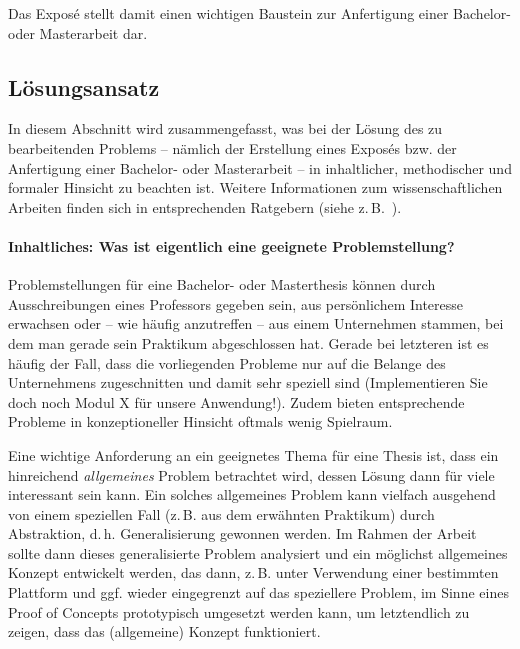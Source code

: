 \documentclass[11pt]{scrartcl}
\newcommand{\qto}[1]{\glqq #1\grqq}				%
\newcommand{\zB}{\mbox{z.\,B.}\xspace}
\newcommand{\dH}{\mbox{d.\,h.}\xspace} %
\newcommand{\ggf}{ggf.\xspace}
\newcommand{\bzw}{bzw.\xspace}
\begin{document}
\noindent
Das Exposé stellt damit einen wichtigen Baustein zur Anfertigung einer Bachelor- oder Masterarbeit dar.


\subsection{Lösungsansatz}

In diesem Abschnitt wird zusammengefasst, was bei der Lösung des zu bearbeitenden \qto{Problems} -- nämlich der Erstellung eines Exposés \bzw der Anfertigung einer Bachelor- oder Masterarbeit -- in inhaltlicher, methodischer und formaler Hinsicht zu beachten ist. Weitere Informationen zum wissenschaftlichen Arbeiten finden sich in entsprechenden Ratgebern (siehe \zB~\cite{lit:FolzEtAl:Studi-SOS}).

\paragraph{Inhaltliches: Was ist eigentlich eine geeignete Problemstellung?}

Problemstellungen für eine Bachelor- oder Masterthesis können durch Ausschreibungen eines Professors gegeben sein, aus persönlichem Interesse erwachsen oder -- wie häufig anzutreffen -- aus einem Unternehmen stammen, bei dem man gerade sein Praktikum abgeschlossen hat. Gerade bei letzteren ist es häufig der Fall, dass die vorliegenden Probleme nur auf die Belange des Unternehmens zugeschnitten und damit sehr speziell sind (\qto{Implementieren Sie doch noch Modul X für unsere Anwendung!}). Zudem bieten entsprechende Probleme in konzeptioneller Hinsicht oftmals wenig Spielraum.

Eine wichtige Anforderung an ein geeignetes Thema für eine Thesis ist, dass ein hinreichend \emph{allgemeines} Problem betrachtet wird, dessen Lösung dann für viele interessant sein kann. Ein solches allgemeines Problem kann vielfach ausgehend von einem speziellen Fall (\zB aus dem erwähnten Praktikum) durch Abstraktion, \dH Generalisierung gewonnen werden. Im Rahmen der Arbeit sollte dann dieses generalisierte Problem analysiert und ein möglichst allgemeines Konzept entwickelt werden, das dann, \zB unter Verwendung einer bestimmten Plattform und \ggf wieder eingegrenzt auf das speziellere Problem, im Sinne eines \qto{Proof of Concepts} prototypisch umgesetzt werden kann, um letztendlich zu zeigen, dass das (allgemeine) Konzept funktioniert.
\end{document}
